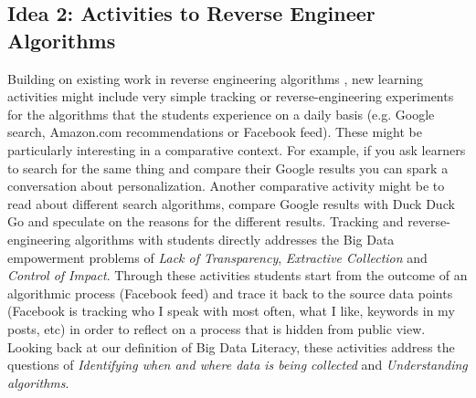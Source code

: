 \documentclass{sig-alternate}
\begin{document}
\subsection{Idea 2: Activities to Reverse Engineer\\Algorithms}
Building on existing work in reverse engineering algorithms \cite{diakopoulos_algorithmic_2015, diakopoulos_tow_2014}, new learning activities might include very simple tracking or reverse-engineering experiments for the algorithms that the students experience on a daily basis (e.g. Google search, Amazon.com recommendations or Facebook feed). These might be particularly interesting in a comparative context. For example, if you ask learners to search for the same thing and compare their Google results you can spark a conversation about personalization. Another comparative activity might be to read about different search algorithms, compare Google results with Duck Duck Go and speculate on the reasons for the different results. Tracking and reverse-engineering algorithms with students directly addresses the Big Data empowerment problems of \textit{Lack of Transparency}, \textit{Extractive Collection} and \textit{Control of Impact}. Through these activities students start from the outcome of an algorithmic process (Facebook feed) and trace it back to the source data points (Facebook is tracking who I speak with most often, what I like, keywords in my posts, etc) in order to reflect on a process that is hidden from public view. Looking back at our definition of Big Data Literacy, these activities address the questions of \textit{Identifying when and where data is being collected} and \textit{Understanding algorithms}. 
\end{document}
